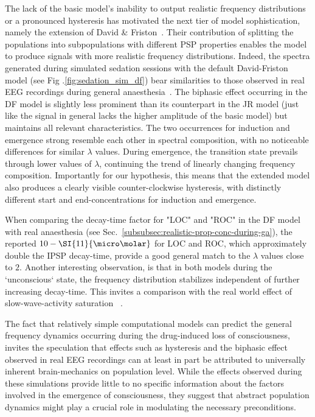 The lack of the basic model's inability to output realistic frequency distributions or a pronounced hysteresis
has motivated the next tier of model sophistication, namely the extension of David \&
Friston~\cite{david_neural_2003}.
Their contribution of splitting the populations into subpopulations with different PSP properties
enables the model to produce signals with more realistic frequency distributions.
Indeed, the spectra generated during simulated sedation sessions with the default David-Friston model
(see Fig .\ref{fig:sedation_sim_df}) bear similarities to those observed in
real EEG recordings during general anaesthesia~\cite{purdon_electroencephalogram_2013}.
The biphasic effect occurring in the DF model is slightly less prominent than its counterpart in the JR model
(just like the signal in general lacks the higher amplitude of the basic model)
but maintains all relevant characteristics.
The two occurrences for induction and emergence strong resemble each other in spectral composition,
with no noticeable differences for similar $\lambda$ values.
During emergence, the transition state prevails through lower values of $\lambda$,
continuing the trend of linearly changing frequency composition.
Importantly for our hypothesis,
this means that the extended model also produces a clearly visible counter-clockwise hysteresis,
with distinctly different start and end-concentrations for induction and emergence.

When comparing the decay-time factor for "LOC" and "ROC" in the DF model
with real anaesthesia (see Sec.~\ref{subsubsec:realistic-prop-conc-during-ga}),
the reported $10-\SI{11}{\micro\molar}$ for LOC and ROC,
which approximately double the IPSP decay-time,
provide a good general match to the $\lambda$ values close to $2$.
Another interesting observation, is that in both models during the `unconscious` state,
the frequency distribution stabilizes independent of further increasing decay-time.
This invites a comparison with the real world effect of slow-wave-activity
saturation ~\cite{ni_mhuircheartaigh_slow_wave_2013}.


The fact that relatively simple computational models can predict the general frequency dynamics occurring during the
drug-induced loss of consciousness,
invites the speculation that effects such as hysteresis and the biphasic effect observed in real EEG recordings can at
least in part be attributed to universally inherent brain-mechanics on population level.
While the effects observed during these simulations provide little to no specific information about the factors
involved in the emergence of consciousness,
they suggest that abstract population dynamics might play a crucial role in modulating the necessary preconditions.

